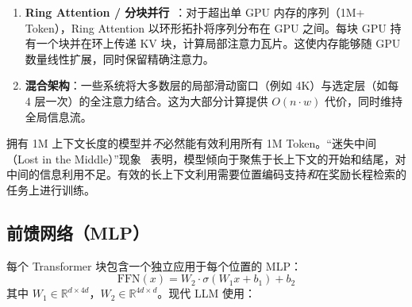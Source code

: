 \begin{enumerate}
  \item \textbf{Ring Attention / 分块并行}~\cite{liu2023ringattention}：对于超出单 GPU 内存的序列（1M+ Token），Ring Attention 以环形拓扑将序列分布在 GPU 之间。每块 GPU 持有一个块并在环上传递 KV 块，计算局部注意力瓦片。这使内存能够随 GPU 数量线性扩展，同时保留精确注意力。
  \item \textbf{混合架构}：一些系统将大多数层的局部滑动窗口（例如 4K）与选定层（如每 4 层一次）的全注意力结合。这为大部分计算提供 $O(n \cdot w)$ 代价，同时维持全局信息流。
\end{enumerate}

\begin{warningbox}[长上下文 $\neq$ 长上下文利用]
拥有 1M 上下文长度的模型并\emph{不}必然能有效利用所有 1M Token。``迷失中间（Lost in the Middle）''现象~\cite{liu2024lost} 表明，模型倾向于聚焦于长上下文的开始和结尾，对中间的信息利用不足。有效的长上下文利用需要位置编码支持\emph{和}在奖励长程检索的任务上进行训练。
\end{warningbox}

\subsection{前馈网络（MLP）}
\label{feed-forward-network-mlp}

每个 Transformer 块包含一个独立应用于每个位置的 MLP：
\[
\text{FFN}(x) = W_2 \cdot \sigma(W_1 x + b_1) + b_2
\]
其中 $W_1 \in \mathbb{R}^{d \times 4d}$，$W_2 \in \mathbb{R}^{4d \times d}$。现代 LLM 使用：

